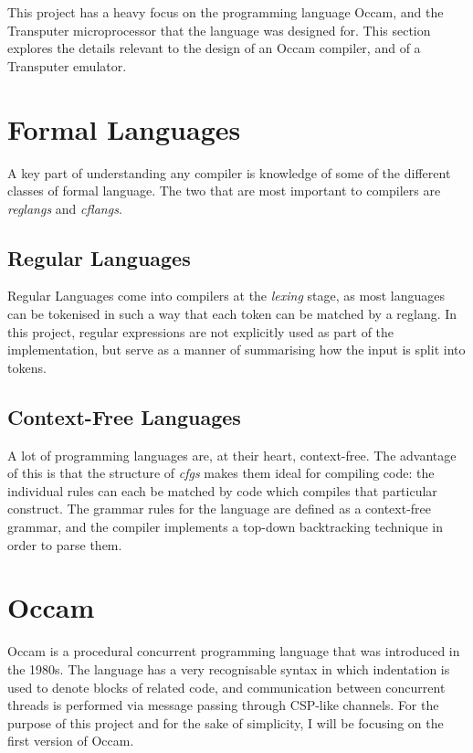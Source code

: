 This project has a heavy focus on the programming language Occam, and the
Transputer microprocessor that the language was designed for. This section
explores the details relevant to the design of an Occam compiler, and of a
Transputer emulator.

\section{Formal Languages}

A key part of understanding any compiler is knowledge of some of the different
classes of formal language. The two that are most important to compilers are
\textit{\gls{reglang}s} and \textit{\gls{cflang}s}.

\subsection{Regular Languages}

Regular Languages come into compilers at the \textit{\gls{lexing}} stage, as most
languages can be tokenised in such a way that each token can be matched by a
\gls{reglang}. In this project, regular expressions are not explicitly used as
part of the implementation, but serve as a manner of summarising how the input
is split into tokens.

\subsection{Context-Free Languages}

A lot of programming languages are, at their heart, context-free. The advantage
of this is that the structure of \textit{\gls{cfg}s} makes them ideal for
compiling code: the individual rules can each be matched by code which compiles
that particular construct. The grammar rules for the language are defined as a
context-free grammar, and the compiler implements a top-down backtracking
technique in order to parse them.

\section{Occam}

Occam is a procedural concurrent programming language that was introduced in the
1980s. The language has a very recognisable syntax in which indentation is used
to denote blocks of related code, and communication between concurrent threads
is performed via message passing through CSP-like channels. For the purpose of
this project and for the sake of simplicity, I will be focusing on the first
version of Occam.

